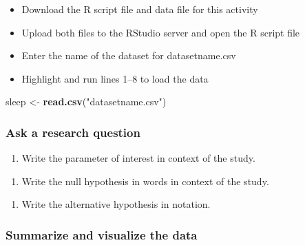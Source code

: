 \documentclass[
]{report}
\newenvironment{Shaded}{\begin{snugshade}}{\end{snugshade}}
\newcommand{\FunctionTok}[1]{\textcolor[rgb]{0.13,0.29,0.53}{\textbf{#1}}}
\newcommand{\NormalTok}[1]{#1}
\newcommand{\OtherTok}[1]{\textcolor[rgb]{0.56,0.35,0.01}{#1}}
\newcommand{\StringTok}[1]{\textcolor[rgb]{0.31,0.60,0.02}{#1}}
\providecommand{\tightlist}{%
  \setlength{\itemsep}{0pt}\setlength{\parskip}{0pt}}
\begin{document}
\begin{itemize}
\item
  Download the R script file and data file for this activity
\item
  Upload both files to the RStudio server and open the R script file
\item
  Enter the name of the dataset for datasetname.csv
\item
  Highlight and run lines 1--8 to load the data
\end{itemize}

\begin{Shaded}
\begin{Highlighting}[]
\NormalTok{sleep }\OtherTok{\textless{}{-}} \FunctionTok{read.csv}\NormalTok{(}\StringTok{"datasetname.csv"}\NormalTok{)}
\end{Highlighting}
\end{Shaded}

\subsubsection*{Ask a research question}\label{ask-a-research-question}

\begin{enumerate}
\def\labelenumi{\arabic{enumi}.}
\tightlist
\item
  Write the parameter of interest in context of the study.
\end{enumerate}

\vspace{1in}

\begin{enumerate}
\def\labelenumi{\arabic{enumi}.}
\setcounter{enumi}{1}
\tightlist
\item
  Write the null hypothesis in words in context of the study.
\end{enumerate}

\vspace{1in}

\begin{enumerate}
\def\labelenumi{\arabic{enumi}.}
\setcounter{enumi}{2}
\tightlist
\item
  Write the alternative hypothesis in notation.
\end{enumerate}

\vspace{0.4in}

\subsubsection*{Summarize and visualize the data}\label{summarize-and-visualize-the-data}
\end{document}
